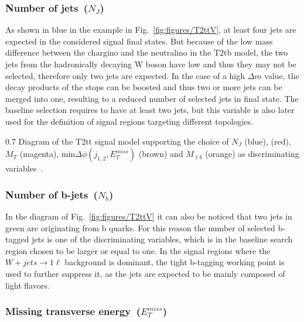 \subsubsection{Number of jets~($N_{J}$)}

As shown in blue in the example in Fig.~\ref{fig:figures/T2ttV}, at least four jets are expected in the considered signal final states. But because of the low mass difference between the chargino and the neutralino in the T2tb model, the two jets from the hadronically decaying W boson have low \pt and thus they may not be selected, therefore only two jets are expected. In the case of a high $\Delta m$ value, the decay products of the stops can be boosted and thus two or more jets can be merged into one, resulting to a  reduced number of selected jets in final state. The baseline selection requires to have at least two jets, but this variable is also later used for the definition of signal regions targeting different topologies.


                 {0.7}       %
                 { Diagram of the T2tt signal model supporting the choice of $N_{J}$ (blue), \MET (red),  $M_{T}$ (magenta), min$\Delta \phi (j_{1,2}, E_{T}^{miss})$ (brown) and $M_{\ell b}$ (orange) as discriminating variables~\cite{CMS:2016vew}. }

\subsubsection{Number of b-jets~($N_{b}$)}

In the diagram of Fig.~\ref{fig:figures/T2ttV} it can also be noticed that two jets in green are originating from b quarks. For this reason the number of selected b-tagged jets is one of the discriminating variables, which is in the baseline search region  chosen to be larger or equal to one. In the signal regions where the $W+jets \to 1\ell$  background is dominant, the tight b-tagging working point is used to further suppress it, as the jets are expected to be mainly composed of light flavors.

\subsubsection{Missing transverse energy~($E_{T}^{miss}$)}

